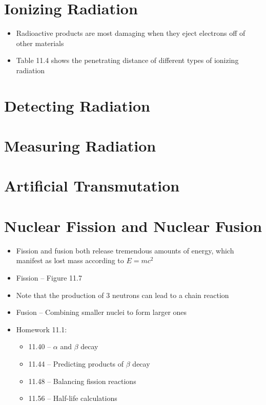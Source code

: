 \documentclass[12pt, openany, letterpaper]{memoir}
\begin{document}
\section{Ionizing Radiation}
\begin{itemize}
	\item Radioactive products are most damaging when they eject electrons off of other materials
	\item Table 11.4 shows the penetrating distance of different types of ionizing radiation
\end{itemize}
\section{Detecting Radiation}
\section{Measuring Radiation}
\section{Artificial Transmutation}
\section{Nuclear Fission and Nuclear Fusion}
\begin{itemize}
	\item Fission and fusion both release tremendous amounts of energy, which manifest as lost mass according to $E=mc^2$
	\item Fission -- Figure 11.7
	
	\item Note that the production of 3 neutrons can lead to a chain reaction
	\item Fusion -- Combining smaller nuclei to form larger ones
	
	
	
	\item Homework 11.1:
	\begin{itemize}
		\item 11.40 -- $\alpha$ and $\beta$ decay
		\item 11.44 -- Predicting products of $\beta$ decay
		\item 11.48 -- Balancing fission reactions
		\item 11.56 -- Half-life calculations
	\end{itemize}
\end{itemize}
\end{document}
